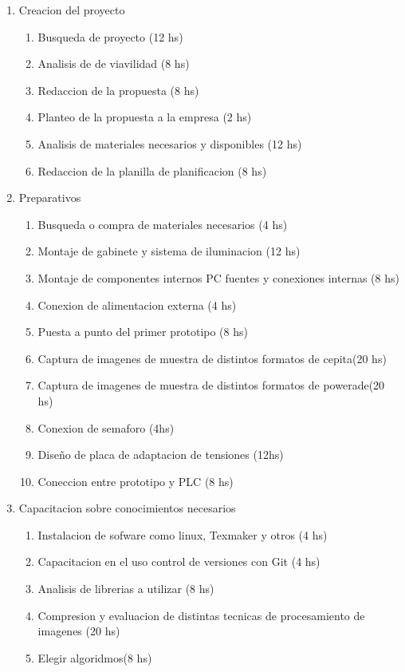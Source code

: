 \documentclass[11pt]{charter}
\begin{document}
\begin{enumerate}
\item Creacion del proyecto
	\begin{enumerate}
	\item Busqueda de proyecto (12 hs)
	\item Analisis de de viavilidad (8 hs)
	\item Redaccion de la propuesta (8 hs)
	\item Planteo de la propuesta a la empresa (2 hs)
	\item Analisis de materiales necesarios y disponibles (12 hs)
	\item Redaccion de la planilla de planificacion (8 hs)
	\end{enumerate}
\item Preparativos
\begin{enumerate}
	\item Busqueda o compra de materiales necesarios (4 hs)
	\item Montaje de gabinete y sistema de iluminacion (12 hs)
	\item Montaje de componentes internos PC fuentes y conexiones internas (8 hs)
	\item Conexion de alimentacion externa (4 hs)
	\item Puesta a punto del primer prototipo (8 hs)
	\item Captura de imagenes de muestra de distintos formatos de cepita(20 hs) 
	\item Captura de imagenes de muestra de distintos formatos de powerade(20 hs)
	\item Conexion de semaforo (4hs)
	\item Diseño de placa de adaptacion de tensiones (12hs)
	\item Coneccion entre prototipo y PLC (8 hs)
	\end{enumerate}
\item Capacitacion sobre conocimientos necesarios
	\begin{enumerate}
	\item Instalacion de sofware como linux, Texmaker y otros (4 hs)
	\item Capacitacion en el uso control de versiones con Git (4 hs)
	\item Analisis de librerias a utilizar (8 hs)
	\item Compresion y evaluacion de distintas tecnicas de procesamiento de imagenes (20 hs)
	\item Elegir algoridmos(8 hs)
	\end{enumerate}

\end{enumerate}
\end{document}
